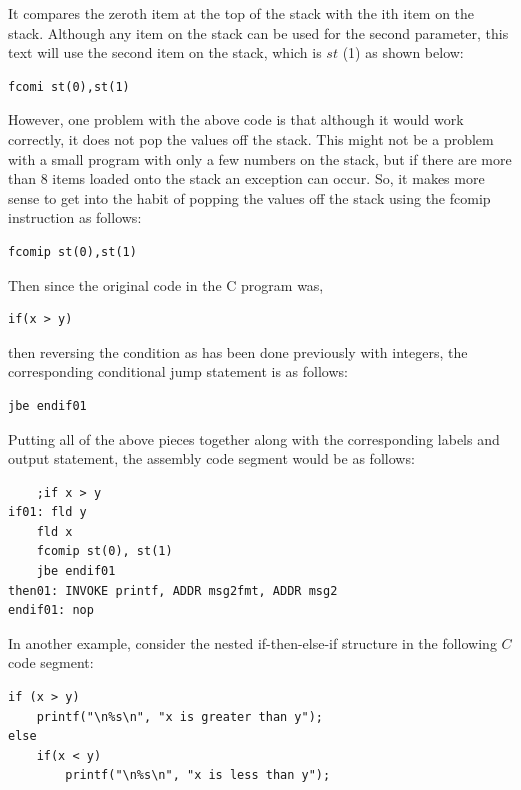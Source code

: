 \documentclass[10pt]{book}
\begin{document}
It compares the zeroth item at the top of the stack with the ith item on the stack. Although any item on the stack can be used for the second parameter, this text will use the second item on the stack, which is $s t$ (1) as shown below:

\begin{verbatim}
fcomi st(0),st(1)
\end{verbatim}

However, one problem with the above code is that although it would work correctly, it does not pop the values off the stack. This might not be a problem with a small program with only a few numbers on the stack, but if there are more than 8 items loaded onto the stack an exception can occur. So, it makes more sense to get into the habit of popping the values off the stack using the fcomip instruction as follows:


\begin{verbatim}
fcomip st(0),st(1)
\end{verbatim}

Then since the original code in the C program was,

\begin{verbatim}
if(x > y)
\end{verbatim}

then reversing the condition as has been done previously with integers, the corresponding conditional jump statement is as follows:

\begin{verbatim}
jbe endif01
\end{verbatim}

Putting all of the above pieces together along with the corresponding labels and output statement, the assembly code segment would be as follows:

\begin{verbatim}
    ;if x > y
if01: fld y
    fld x
    fcomip st(0), st(1)
    jbe endif01
then01: INVOKE printf, ADDR msg2fmt, ADDR msg2
endif01: nop
\end{verbatim}

In another example, consider the nested if-then-else-if structure in the following $C$ code segment:

\begin{verbatim}
if (x > y)
    printf("\n%s\n", "x is greater than y");
else
    if(x < y)
        printf("\n%s\n", "x is less than y");
\end{verbatim}
\end{document}
